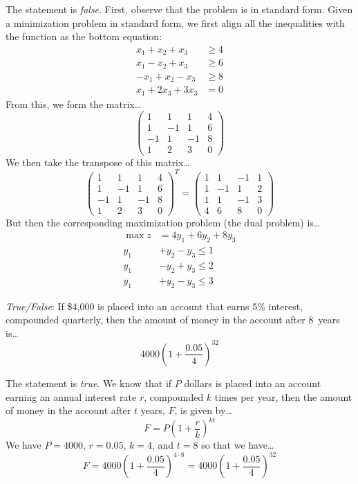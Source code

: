 \documentclass[11pt,letterpaper]{article}
\begin{document}
\sol The statement is \textit{false}. First, observe that the problem is in standard form. Given a minimization problem in standard form, we first align all the inequalities with the function as the bottom equation:
	\[
	\begin{aligned}
	x_1 + x_2 + x_3&\geq 4 \\
	x_1 - x_2 + x_3&\geq 6 \\
	-x_1 + x_2 - x_3&\geq 8 \\
	x_1 + 2x_3 + 3x_3&= 0 
	\end{aligned}
	\]
From this, we form the matrix\dots
	\[
	\begin{pmatrix}
	1 & 1 & 1 & 4 \\
	1 & -1 & 1 & 6 \\
	-1 & 1 & -1 & 8 \\
	1 & 2 & 3 & 0 
	\end{pmatrix}
	\]
We then take the transpose of this matrix\dots
	\[
	\begin{pmatrix}
	1 & 1 & 1 & 4 \\
	1 & -1 & 1 & 6 \\
	-1 & 1 & -1 & 8 \\
	1 & 2 & 3 & 0 
	\end{pmatrix}^T= 
	\begin{pmatrix}
	1 & 1 & -1 & 1 \\
	1 & -1 & 1 & 2 \\
	1 & 1 & -1 & 3 \\
	4 & 6 & 8 & 0 
	\end{pmatrix}
	\]
But then the corresponding maximization problem (the dual problem) is\dots
	\[
	\begin{aligned}
	\max z&= 4y_1 + 6y_2 + 8y_3 \\
	y_1 &+ y_2 - y_3 \leq 1 \\
	y_1 &- y_2 + y_3 \leq 2 \\
	y_1 &+ y_2 - y_3 \leq 3
	\end{aligned}
	\]



\newpage



\quizsol \textit{True/False}: If \$4,000 is placed into an account that earns 5\% interest, compounded quarterly, then the amount of money in the account after 8~years is\dots
	\[
	4000 \left(1 + \dfrac{0.05}{4} \right)^{32}
	\]

\sol The statement is \textit{true}. We know that if $P$ dollars is placed into an account earning an annual interest rate $r$, compounded $k$ times per year, then the amount of money in the account after $t$ years, $F$, is given by\dots
	\[
	F= P \left(1 + \dfrac{r}{k} \right)^{kt}
	\]
We have $P= 4000$, $r= 0.05$, $k= 4$, and $t= 8$ so that we have\dots
	\[
	F= 4000 \left(1 + \dfrac{0.05}{4} \right)^{4 \cdot 8}= 4000 \left(1 + \dfrac{0.05}{4} \right)^{32}
	\] \pvspace{1.3cm}
\end{document}
